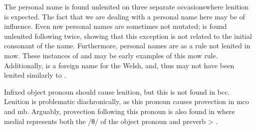 The personal name  is found unlenited on three separate occasionswhere lenition is expected.
The fact that we are dealing with a personal name here may be of influence. Even \gls{mw} personal names are sometimes not mutated;  is found unlenited following  twice, showing that this exception is not related to the initial consonant of the name.
Furthermore, personal names are as a rule not lenited in \gls{mow}.
These instances of  and  may be early examples of this \gls{mow} rule.
Additionally,  is a foreign name for the Welsh, and, thus may not have been lenited similarly to .

Infixed object pronoun  should cause lenition, but this is not found in \gls{bcc}.
Lenition is problematic diachronically, as this pronoun causes provection in \gls{mco} and \gls{mb}.
Arguably, provection following this pronoun is also found in  where medial  represents both the /θ/ of the object pronoun and preverb  > .

